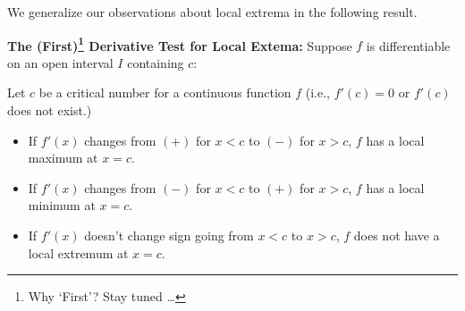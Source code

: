 We generalize our observations about local extrema in the following result.

\medskip

\colorbox{ResultColor}{\bbm

\begin{thm}  \label{firstderivatvetest}   \textbf{The (First)\footnote{Why `First'?  Stay tuned \ldots} Derivative Test for Local Extema:}  Suppose $f$ is differentiable on an open interval $I$ containing $c$:

Let  $c$ be a critical number for a continuous function $f$ (i.e.,   $f'(c) = 0$ or $f'(c)$ does not exist.)

\begin{itemize}

\item If $f'(x)$ changes from $(+)$ for $x<c$ to $(-)$ for $x>c$, $f$ has a local maximum at $x=c$.

\item If $f'(x)$ changes from $(-)$ for $x<c$ to $(+)$ for $x>c$, $f$ has a local minimum at $x=c$.

\item If $f'(x)$ doesn't change sign going from $x<c$ to $x>c$, $f$ does not have a local extremum at $x=c$.

\end{itemize}

\end{thm}
\ebm}

\medskip

